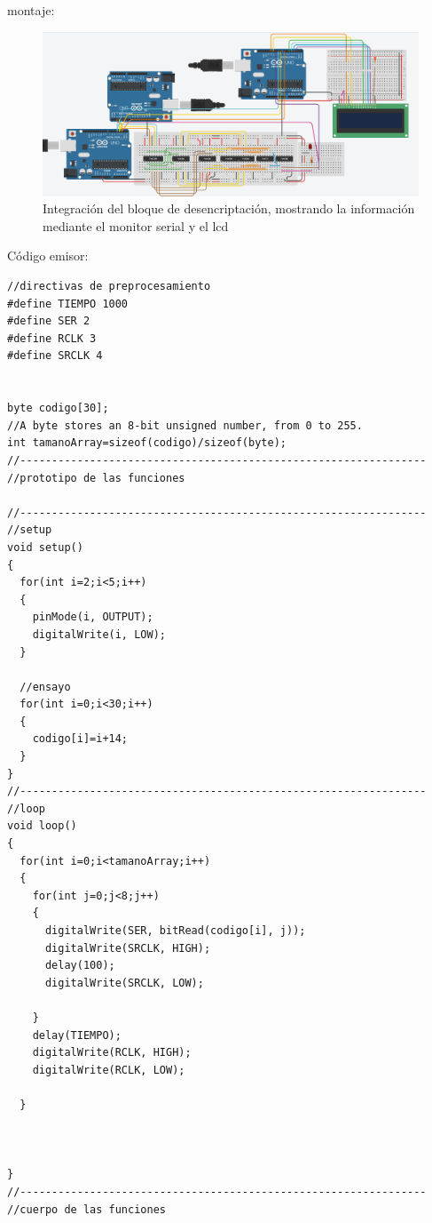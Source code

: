 \documentclass{article}
\begin{document}
\newline montaje:
\begin{figure}[h]
\includegraphics[scale=0.5]{integracion arduinos serial y lcd.png}
\centering
\caption{Integración del bloque de desencriptación, mostrando la información mediante el monitor serial y el lcd}
\label{fig:serialLcd}
\end{figure}

Código emisor:
\begin{lstlisting}[style=myArduino]
//directivas de preprocesamiento
#define TIEMPO 1000
#define SER 2
#define RCLK 3
#define SRCLK 4


byte codigo[30];
//A byte stores an 8-bit unsigned number, from 0 to 255.
int tamanoArray=sizeof(codigo)/sizeof(byte);
//----------------------------------------------------------------
//prototipo de las funciones

//----------------------------------------------------------------
//setup
void setup()
{
  for(int i=2;i<5;i++)
  {
    pinMode(i, OUTPUT);
    digitalWrite(i, LOW);
  }
  
  //ensayo
  for(int i=0;i<30;i++)
  {
    codigo[i]=i+14;
  }
}
//----------------------------------------------------------------
//loop
void loop()
{
  for(int i=0;i<tamanoArray;i++)
  {
    for(int j=0;j<8;j++)
    {
      digitalWrite(SER, bitRead(codigo[i], j));
      digitalWrite(SRCLK, HIGH);
      delay(100);
      digitalWrite(SRCLK, LOW);

    }
    delay(TIEMPO);
    digitalWrite(RCLK, HIGH);
    digitalWrite(RCLK, LOW);
    
  }
  
  
  
}
//----------------------------------------------------------------
//cuerpo de las funciones
\end{lstlisting}
\end{document}
